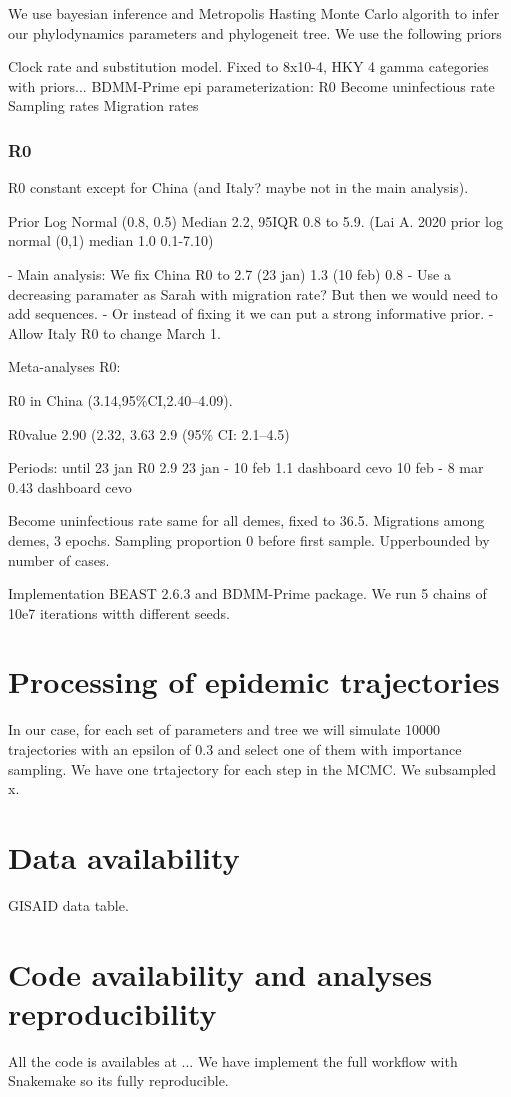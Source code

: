We use bayesian inference and Metropolis Hasting Monte Carlo algorith to infer our phylodynamics parameters and phylogeneit tree. We use the following priors

Clock rate and substitution model. Fixed to 8x10-4, HKY 4 gamma categories with priors...
BDMM-Prime epi parameterization:
R0
Become uninfectious rate
Sampling rates
Migration rates


\subsubsection{R0}
R0 constant except for China (and Italy? maybe not in the main analysis).

Prior Log Normal (0.8, 0.5) Median 2.2, 95IQR 0.8 to 5.9.
(Lai A. 2020 prior log normal (0,1) median 1.0 0.1-7.10)

- Main analysis: We fix China R0 to 2.7 (23 jan) 1.3 (10 feb) 0.8
- Use a decreasing paramater as Sarah with migration rate? But then we would need to add sequences.
- Or instead of fixing it we can put a strong informative prior.
- Allow Italy R0 to change March 1.


Meta-analyses R0:

R0 in China (3.14,95\%CI,2.40–4.09).\cite{Billah2020}

R0value 2.90 (2.32, 3.63
 2.9 (95\% CI: 2.1–4.5)\cite{Park2020}


Periods:
until 23 jan R0 2.9 
23 jan - 10 feb 1.1 dashboard cevo
10 feb - 8 mar 0.43 dashboard cevo



Become uninfectious rate same for all demes, fixed to 36.5.
Migrations among demes, 3 epochs.
Sampling proportion 0 before first sample. Upperbounded by number of cases.

Implementation BEAST 2.6.3 and BDMM-Prime package.
We run 5 chains of 10e7 iterations witth different seeds.

\section{Processing of epidemic trajectories}
In our case, for each set of parameters and tree we will simulate 10000 trajectories with an epsilon of 0.3 and select one of them with importance sampling.
We have one trtajectory for each step in the MCMC. We subsampled x. 

\section{Data availability}
GISAID data table.

\section{Code availability and analyses reproducibility}
All the code is availables at ...
We have implement the full workflow with Snakemake so its fully reproducible.

